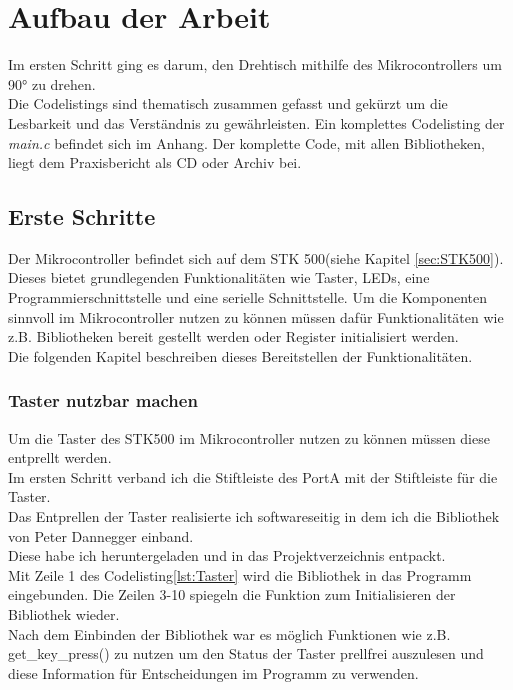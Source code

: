 \chapter{Aufbau der Arbeit}
\label{sec:AufbauDerArbeit}
Im ersten Schritt ging es darum, den Drehtisch mithilfe des Mikrocontrollers um 90° zu drehen.\\
Die Codelistings sind thematisch zusammen gefasst und gekürzt um die Lesbarkeit und das Verständnis zu gewährleisten.
Ein komplettes Codelisting der \textit{main.c} befindet sich im Anhang. Der komplette Code, mit allen Bibliotheken, liegt dem Praxisbericht als CD oder Archiv bei. 

\section{Erste Schritte}
\label{sec:Erste_Schritte}
Der Mikrocontroller befindet sich auf dem STK 500(siehe Kapitel \ref{sec:STK500}). Dieses bietet grundlegenden Funktionalitäten wie Taster, LEDs, eine Programmierschnittstelle und eine serielle Schnittstelle.
Um die Komponenten sinnvoll im Mikrocontroller nutzen zu können müssen dafür Funktionalitäten wie z.B. Bibliotheken bereit gestellt werden oder Register initialisiert werden.\\
Die folgenden Kapitel beschreiben dieses Bereitstellen der Funktionalitäten.
\subsection{Taster nutzbar machen}
\label{sec:Taster}
Um die Taster des STK500 im Mikrocontroller nutzen zu können müssen diese entprellt werden.\\
Im ersten Schritt verband ich die Stiftleiste des PortA mit der Stiftleiste für die Taster.\\
Das Entprellen der Taster realisierte ich softwareseitig in dem ich die Bibliothek\cite{uC:Dannegger} von Peter Dannegger einband.\\
Diese habe ich heruntergeladen und in das Projektverzeichnis entpackt.\\
Mit Zeile 1 des Codelisting\ref{lst:Taster} wird die Bibliothek in das Programm eingebunden. Die Zeilen 3-10 spiegeln die Funktion zum Initialisieren der Bibliothek wieder.\\
Nach dem Einbinden der Bibliothek war es möglich Funktionen wie z.B. get\_key\_press() zu nutzen um den Status der Taster prellfrei auszulesen und diese Information für Entscheidungen im Programm zu verwenden.
\lstset{language=C, basicstyle=\footnotesize, showstringspaces=false, tabsize=8}


